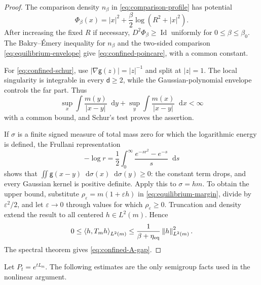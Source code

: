 \documentclass[11pt,reqno]{amsart}
\numberwithin{equation}{section}
\theoremstyle{definition}
\theoremstyle{remark}
\newcommand{\g}{\mathsf g}
\renewcommand{\d}{\mathsf d}
\newcommand{\Id}{\operatorname{Id}}
\newcommand{\dd}{\mathop{}\!\mathrm d}
\newcommand{\norm}[1]{\left\lVert#1\right\rVert}
\newcommand{\ip}[2]{\left\langle#1,#2\right\rangle}
\begin{document}
\begin{proof}
The comparison density $n_\beta$ in \eqref{eq:comparison-profile} has potential
\begin{equation}\label{eq:comparison-potential}
 \Phi_\beta(x)=|x|^2+\frac\beta2\log(R^2+|x|^2).
\end{equation}
After increasing the fixed $R$ if necessary, $D^2\Phi_\beta\geq\Id$ uniformly for $0\leq\beta\leq\beta_0$. The Bakry--\'Emery inequality for $n_\beta$ and the two-sided comparison \eqref{eq:equilibrium-envelope} give \eqref{eq:confined-poincare}, with a common constant.

For \eqref{eq:confined-schur}, use $|\nabla\g(z)|=|z|^{-1}$ and split at $|z|=1$. The local singularity is integrable in every $\d\geq2$, while the Gaussian-polynomial envelope controls the far part. Thus
\begin{equation}\label{eq:schur-kernel-bound}
 \sup_x\int\frac{m(y)}{|x-y|}\dd y+
 \sup_y\int\frac{m(x)}{|x-y|}\dd x<\infty
\end{equation}
with a common bound, and Schur's test proves the assertion.

If $\sigma$ is a finite signed measure of total mass zero for which the logarithmic energy is defined, the Frullani representation
\begin{equation}\label{eq:frullani-log}
 -\log r=\frac12\int_0^\infty\frac{e^{-sr^2}-e^{-s}}s\dd s
\end{equation}
shows that $\iint\g(x-y)\dd\sigma(x)\dd\sigma(y)\geq0$: the constant term drops, and every Gaussian kernel is positive definite. Apply this to $\sigma=hm$. To obtain the upper bound, substitute $\rho_\varepsilon=m(1+\varepsilon h)$ in \eqref{eq:equilibrium-margin}, divide by $\varepsilon^2/2$, and let $\varepsilon\to0$ through values for which $\rho_\varepsilon\geq0$. Truncation and density extend the result to all centered $h\in L^2(m)$. Hence
\begin{equation}\label{eq:response-form-bound}
 0\leq\ip{h}{T_mh}_{L^2(m)}
 \leq\frac1{\beta+\eta_{\rm eq}}\norm h_{L^2(m)}^2.
\end{equation}
The spectral theorem gives \eqref{eq:confined-A-gap}.
\end{proof}

Let $P_t=e^{tL_m}$. The following estimates are the only semigroup facts used in the nonlinear argument.
\end{document}
